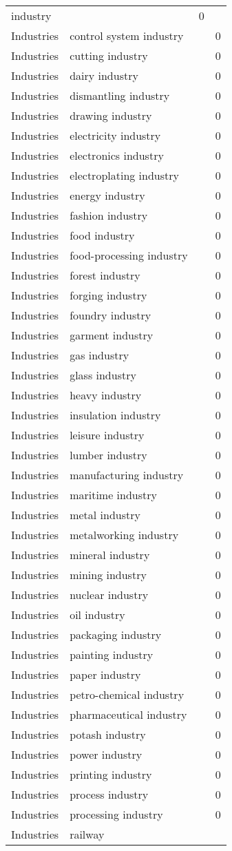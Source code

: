 {\begin{longtable}{lp{10cm}rr}
industry &  & 0\\Industries & control system industry &  & 0\\Industries & cutting industry &  & 0\\Industries & dairy industry &  & 0\\Industries & dismantling industry &  & 0\\Industries & drawing industry &  & 0\\Industries & electricity industry &  & 0\\Industries & electronics industry &  & 0\\Industries & electroplating industry &  & 0\\Industries & energy industry &  & 0\\Industries & fashion industry &  & 0\\Industries & food industry &  & 0\\Industries & food-processing industry &  & 0\\Industries & forest industry &  & 0\\Industries & forging industry &  & 0\\Industries & foundry industry &  & 0\\Industries & garment industry &  & 0\\Industries & gas industry &  & 0\\Industries & glass industry &  & 0\\Industries & heavy industry &  & 0\\Industries & insulation industry &  & 0\\Industries & leisure industry &  & 0\\Industries & lumber industry &  & 0\\Industries & manufacturing industry &  & 0\\Industries & maritime industry &  & 0\\Industries & metal industry &  & 0\\Industries & metalworking industry &  & 0\\Industries & mineral industry &  & 0\\Industries & mining industry &  & 0\\Industries & nuclear industry &  & 0\\Industries & oil industry &  & 0\\Industries & packaging industry &  & 0\\Industries & painting industry &  & 0\\Industries & paper industry &  & 0\\Industries & petro-chemical industry &  & 0\\Industries & pharmaceutical industry &  & 0\\Industries & potash industry &  & 0\\Industries & power industry &  & 0\\Industries & printing industry &  & 0\\Industries & process industry &  & 0\\Industries & processing industry &  & 0\\Industries & railway 
\end{longtable}}
